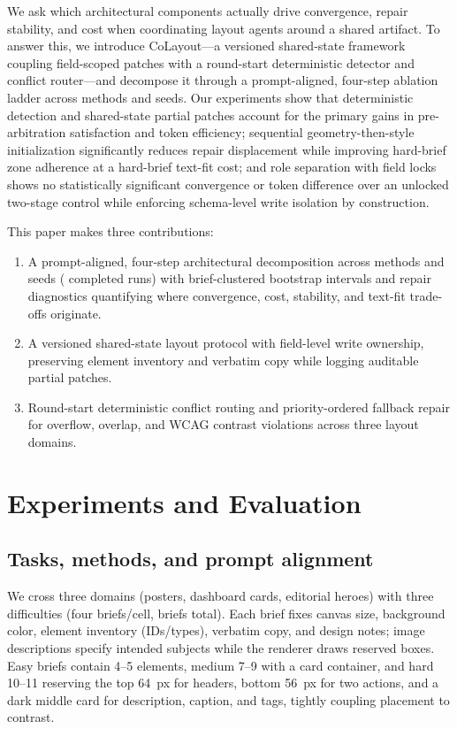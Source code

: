 \documentclass[conference]{IEEEtran}
\begin{document}
We ask which architectural components actually drive convergence, repair
stability, and cost when coordinating layout agents around a shared artifact. To
answer this, we introduce CoLayout---a versioned shared-state framework coupling
field-scoped patches with a round-start deterministic detector and conflict
router---and decompose it through a prompt-aligned, four-step ablation ladder
across \vMethodCount{} methods and \vSeedCount{} seeds. Our experiments show
that deterministic detection and shared-state partial patches account for the
primary gains in pre-arbitration satisfaction and token efficiency; sequential
geometry-then-style initialization significantly reduces repair displacement
while improving hard-brief zone adherence at a hard-brief text-fit cost; and
role separation with field locks shows no statistically significant convergence
or token difference over an unlocked two-stage control while enforcing
schema-level write isolation by construction.

This paper makes three contributions:
\begin{enumerate}
\item A prompt-aligned, four-step architectural decomposition across
\vMethodCount{} methods and \vSeedCount{} seeds (\vRunsTotal{} completed runs)
with brief-clustered bootstrap intervals and repair diagnostics quantifying
where convergence, cost, stability, and text-fit trade-offs originate.
\item A versioned shared-state layout protocol with field-level write ownership,
preserving element inventory and verbatim copy while logging auditable partial
patches.
\item Round-start deterministic conflict routing and priority-ordered fallback
repair for overflow, overlap, and WCAG contrast violations across three layout
domains.
\end{enumerate}




\section{Experiments and Evaluation}\label{sec:evaluation}


\subsection{Tasks, methods, and prompt alignment}
We cross three domains (posters, dashboard cards, editorial heroes) with three
difficulties (four briefs/cell, \vBriefCount{} briefs total). Each brief fixes
canvas size, background color, element inventory (IDs/types), verbatim copy, and
design notes; image descriptions specify intended subjects while the renderer
draws reserved boxes. Easy briefs contain 4--5 elements, medium 7--9 with a card
container, and hard 10--11 reserving the top 64~px for headers, bottom 56~px for
two actions, and a dark middle card for description, caption, and tags, tightly coupling
placement to contrast.
\end{document}
